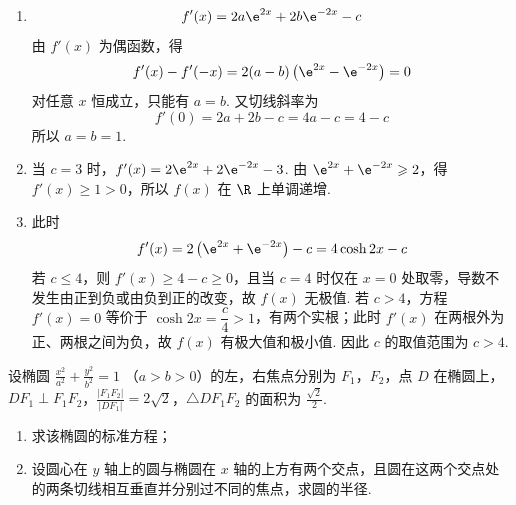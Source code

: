\begin{solution}
\begin{enumerate}
\item
\[
f'(x)=2a\e^{2x}+2b\e^{-2x}-c
\]
由 \(f'(x)\) 为偶函数，得
\[
f'(x)-f'(-x)=2(a-b)\left(\e^{2x}-\e^{-2x}\right)=0
\]
对任意 \(x\) 恒成立，只能有 \(a=b\). 又切线斜率为
\[
f'(0)=2a+2b-c=4a-c=4-c
\]
所以 \(a=b=1\).

\item 当 \(c=3\) 时，\(f'(x)=2\e^{2x}+2\e^{-2x}-3\). 由
\(\e^{2x}+\e^{-2x}\geqslant2\)，得 \(f'(x)\geqslant1>0\)，所以 \(f(x)\) 在 \(\R\) 上单调递增.

\item 此时
\[
f'(x)=2\left(\e^{2x}+\e^{-2x}\right)-c=4\cosh 2x-c
\]
若 \(c\leqslant4\)，则 \(f'(x)\geqslant4-c\geqslant0\)，且当 \(c=4\) 时仅在 \(x=0\) 处取零，导数不发生由正到负或由负到正的改变，故 \(f(x)\) 无极值.
若 \(c>4\)，方程 \(f'(x)=0\) 等价于 \(\cosh 2x=\dfrac{c}{4}>1\)，有两个实根；此时 \(f'(x)\) 在两根外为正、两根之间为负，故 \(f(x)\) 有极大值和极小值.
因此 \(c\) 的取值范围为 \(c>4\).
\end{enumerate}
\end{solution}

\begin{problem}
设椭圆 \(\frac{x^2}{a^2} + \frac{y^2}{b^2} = 1 \) （\(a > b > 0\)）的左，右焦点分别为 \(F_1\)，\(F_2\)，点 \(D\) 在椭圆上，\(DF_1 \perp F_1F_2\)，\(\frac{|F_1F_2|}{|DF_1|} = 2\sqrt{2}\)，\(\triangle DF_1F_2\) 的面积为 \(\frac{\sqrt{2}}{2}\).

\begin{enumerate}
\item 求该椭圆的标准方程；
\item 设圆心在 \(y\) 轴上的圆与椭圆在 \(x\) 轴的上方有两个交点，且圆在这两个交点处的两条切线相互垂直并分别过不同的焦点，求圆的半径.
\end{enumerate}

\end{problem}

